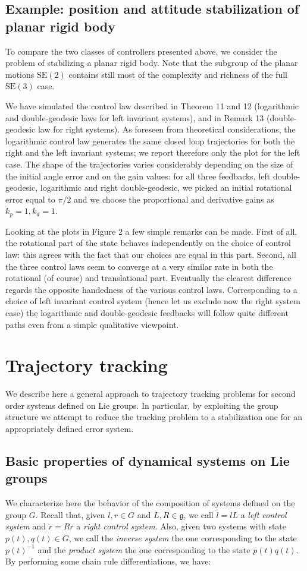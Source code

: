 \documentclass[10pt,twocolumn]{article}
\newcommand{\SE}{\mathrm{SE}}
\newcommand{\gfrak}{\mathfrak g}
\begin{document}
\subsection{Example: position and attitude stabilization of planar rigid body}
To compare the two classes of controllers presented above, we consider the problem of stabilizing a planar rigid body. Note that the subgroup of the planar motions $\SE(2)$ contains still most of the complexity and richness of the full $\SE(3)$ case.

We have simulated the control law described in Theorem 11 and 12 (logarithmic and double-geodesic laws for left invariant systems), and in Remark 13 (double-geodesic law for right systems). As foreseen from theoretical considerations, the logarithmic control law generates the same closed loop trajectories for both the right and the left invariant systems; we report therefore only the plot for the left case. The shape of the trajectories varies considerably depending on the size of the initial angle error and on the gain values: for all three feedbacks, left double-geodesic, logarithmic and right double-geodesic, we picked an initial rotational error equal to $\pi/2$ and we choose the proportional and derivative gains as $k_p=1,k_d=1$.

Looking at the plots in Figure 2 a few simple remarks can be made. First of all, the rotational part of the state behaves independently on the choice of control law: this agrees with the fact that our choices are equal in this part. Second, all the three control laws seem to converge at a very similar rate in both the rotational (of course) and translational part. Eventually the clearest difference regards the opposite handedness of the various control laws. Corresponding to a choice of left invariant control system (hence let us exclude now the right system case) the logarithmic and double-geodesic feedbacks will follow quite different paths even from a simple qualitative viewpoint.

\section{Trajectory tracking}
We describe here a general approach to trajectory tracking problems for second order systems defined on Lie groups. In particular, by exploiting the group structure we attempt to reduce the tracking problem to a stabilization one for an appropriately defined error system.

\subsection{Basic properties of dynamical systems on Lie groups}
We characterize here the behavior of the composition of systems defined on the group $G$. Recall that, given $l,r\in G$ and $L,R\in\gfrak$, we call $\dot l=lL$ a \emph{left control system} and $\dot r=Rr$ a \emph{right control system}. Also, given two systems with state $p(t),q(t)\in G$, we call the \emph{inverse system} the one corresponding to the state $p(t)^{-1}$ and the \emph{product system} the one corresponding to the state $p(t)q(t)$. By performing some chain rule differentiations, we have:
\end{document}
